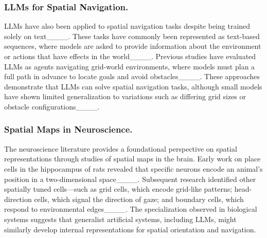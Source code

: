 \subsubsection{LLMs for Spatial Navigation.} LLMs have also been applied to spatial navigation tasks despite being trained solely on text____. These tasks have commonly been represented as text-based sequences, where models are asked to provide information about the environment or actions that have effects in the world____. Previous studies have evaluated LLMs as agents navigating grid-world environments, where models must plan a full path in advance to locate goals and avoid obstacles____. These approaches demonstrate that LLMs can solve spatial navigation tasks, although small models have shown limited generalization to variations such as differing grid sizes or obstacle configurations____.

\subsubsection{Spatial Maps in Neuroscience.} The neuroscience literature provides a foundational perspective on spatial representations through studies of spatial maps in the brain. Early work on place cells in the hippocampus of rats revealed that specific neurons encode an animal’s position in a two-dimensional space____. Subsequent research identified other spatially tuned cells—such as grid cells, which encode grid-like patterns; head-direction cells, which signal the direction of gaze; and boundary cells, which respond to environmental edges____. The specialization observed in biological systems suggests that generalist artificial systems, including LLMs, might similarly develop internal representations for spatial orientation and navigation.